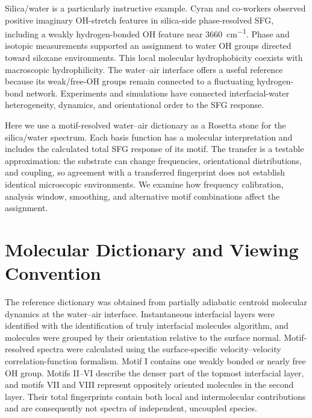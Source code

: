 \documentclass[aip,jcp,reprint,amsmath,amssymb]{revtex4-2}
\newcommand{\sfg}{SFG\xspace}
\begin{document}
Silica/water is a particularly instructive example. Cyran and co-workers observed positive imaginary OH-stretch features in silica-side phase-resolved \sfg, including a weakly hydrogen-bonded OH feature near \SI{3660}{cm^{-1}}.\cite{Cyran2019PNAS} Phase and isotopic measurements supported an assignment to water OH groups directed toward siloxane environments. This local molecular hydrophobicity coexists with macroscopic hydrophilicity. The water--air interface offers a useful reference because its weak/free-OH groups remain connected to a fluctuating hydrogen-bond network.\cite{Kuhne2011JPCL,Kessler2015JPCB} Experiments and simulations have connected interfacial-water heterogeneity, dynamics, and orientational order to the \sfg response.\cite{Hsieh2014Angew,Cyran2018JPCB,Sulpizi2013JPCL,Ohto2019JPCL,Kaliannan2020MolPhys}

Here we use a motif-resolved water--air dictionary as a Rosetta stone for the silica/water spectrum. Each basis function has a molecular interpretation and includes the calculated total \sfg response of its motif. The transfer is a testable approximation: the substrate can change frequencies, orientational distributions, and coupling, so agreement with a transferred fingerprint does not establish identical microscopic environments. We examine how frequency calibration, analysis window, smoothing, and alternative motif combinations affect the assignment.

\section{Molecular Dictionary and Viewing Convention}

The reference dictionary was obtained from partially adiabatic centroid molecular dynamics at the water--air interface.\cite{Kaliannan2026Rosetta} Instantaneous interfacial layers were identified with the identification of truly interfacial molecules algorithm, and molecules were grouped by their orientation relative to the surface normal. Motif-resolved spectra were calculated using the surface-specific velocity--velocity correlation-function formalism.\cite{Ohto2015JCP,Kaliannan2020MolPhys} Motif I contains one weakly bonded or nearly free OH group. Motifs II--VI describe the denser part of the topmost interfacial layer, and motifs VII and VIII represent oppositely oriented molecules in the second layer. Their total fingerprints contain both local and intermolecular contributions and are consequently not spectra of independent, uncoupled species.
\end{document}
